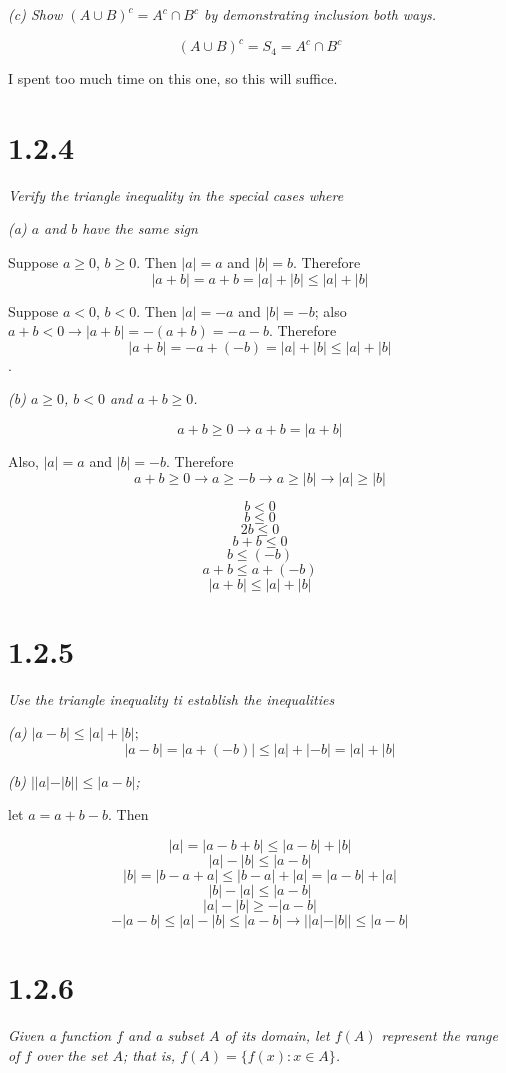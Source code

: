 \documentclass[11pt,oneside,titlepage]{article}
\begin{document}
\textit{(c) Show $(A \cup B)^c = A^c \cap B^c$ by demonstrating inclusion both
  ways.}

$$(A \cup B)^c = S_4 = A^c \cap B^c$$

I spent too much time on this one, so this will suffice.

\section*{1.2.4}
\textit{Verify the triangle inequality in the special cases where }

\textit{(a) $a$ and $b$ have the same sign}

Suppose $a \geq 0$, $b \geq 0$. Then $|a| = a$ and $|b| = b$. Therefore
$$|a + b| = a + b = |a| + |b| \leq  |a| + |b|$$

Suppose $a < 0$, $b < 0$. Then $|a| = -a$ and $|b| = -b$; also $a + b < 0 \to
|a + b| = -(a + b) = -a - b$. Therefore 
$$|a + b| = -a + (-b) = |a| + |b| \leq  |a| + |b|$$.

\textit{(b) $a \geq 0$, $b < 0$ and $a + b \geq 0$.}

$$a + b \geq 0 \to a + b = |a + b|$$

Also, $|a| = a$ and $|b| = -b$. Therefore
$$a + b \geq 0 \to a \geq -b \to a \geq |b| \to |a| \geq |b|$$

$$ b < 0$$
$$ b \leq 0$$
$$ 2b \leq 0$$
$$ b + b \leq 0$$
$$ b \leq (-b)$$
$$a + b \leq a + (-b)$$
$$|a + b| \leq |a| + |b|$$

\section*{1.2.5}
\textit{Use the triangle inequality ti establish the inequalities}

\textit{(a) $|a - b| \leq |a| + |b|;$}
$$|a - b| = |a + (-b)| \leq |a| + |-b| = |a| + |b|$$

\textit{(b) $||a| - |b|| \leq |a - b|$;}

let $a = a + b - b$. Then

$$|a| = |a - b + b| \leq |a - b| + |b|$$
$$|a| - |b| \leq |a - b|$$
$$|b| = |b - a + a| \leq |b - a| + |a| = |a - b| + |a|$$
$$|b| - |a| \leq |a - b|$$
$$|a| - |b| \geq -|a - b|$$
$$-|a - b| \leq |a| - |b| \leq |a - b| \to ||a| - |b|| \leq |a - b|$$

\section*{1.2.6}
\textit{Given a function $f$ and a subset $A$ of its domain, let $f(A)$
  represent the range of $f$ over the set $A$; that is,
  $f(A) = \{f(x): x \in A\}$. }
\end{document}
